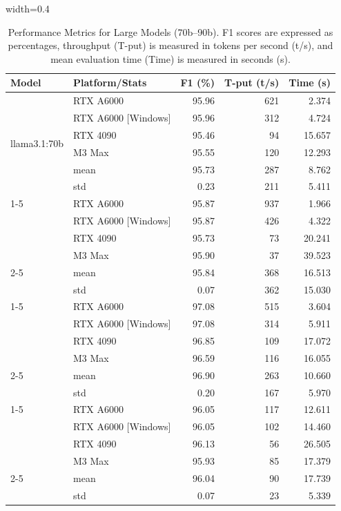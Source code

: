 \documentclass[conference]{IEEEtran}
\begin{document}
\begin{table}[htbp]
    \centering
    \begin{adjustbox}{width=0.4\textwidth}
    \begin{tabular}{llrrr}
\toprule
\textbf{Model} & \textbf{Platform/Stats} & \textbf{F1 (\%)} & \textbf{T-put (t/s)} & \textbf{Time (s)} \\
\midrule
\multirow[t]{6}{*}{llama3.1:70b} & RTX A6000 & 95.96 & 621 & 2.374 \\
 & RTX A6000 [Windows] & 95.96 & 312 & 4.724 \\
 & RTX 4090 & 95.46 & 94 & 15.657 \\
 & M3 Max & 95.55 & 120 & 12.293 \\
 \cmidrule(lr){2-5}
 & mean & 95.73 & 287 & 8.762 \\
 & std & 0.23 & 211 & 5.411 \\
\cline{1-5}
\multirow[t]{6}{*}{llama3.3:70b} & RTX A6000 & 95.87 & 937 & 1.966 \\
 & RTX A6000 [Windows] & 95.87 & 426 & 4.322 \\
 & RTX 4090 & 95.73 & 73 & 20.241 \\
 & M3 Max & 95.90 & 37 & 39.523 \\
 \cmidrule(lr){2-5}
 & mean & 95.84 & 368 & 16.513 \\
 & std & 0.07 & 362 & 15.030 \\
\cline{1-5}
\multirow[t]{6}{*}{qwen2.5:72b} & RTX A6000 & 97.08 & 515 & 3.604 \\
 & RTX A6000 [Windows] & 97.08 & 314 & 5.911 \\
 & RTX 4090 & 96.85 & 109 & 17.072 \\
 & M3 Max & 96.59 & 116 & 16.055 \\
 \cmidrule(lr){2-5}
 & mean & 96.90 & 263 & 10.660 \\
 & std & 0.20 & 167 & 5.970 \\
\cline{1-5}
\multirow[t]{6}{*}{llama3.2-vision:90b} & RTX A6000 & 96.05 & 117 & 12.611 \\
 & RTX A6000 [Windows] & 96.05 & 102 & 14.460 \\
 & RTX 4090 & 96.13 & 56 & 26.505 \\
 & M3 Max & 95.93 & 85 & 17.379 \\
 \cmidrule(lr){2-5}
 & mean & 96.04 & 90 & 17.739 \\
 & std & 0.07 & 23 & 5.339 \\
\bottomrule
\end{tabular}
    \end{adjustbox}
    \caption{Performance Metrics for Large Models (70b–90b). F1 scores are expressed as percentages, throughput (T-put) is measured in tokens per second (t/s), and mean evaluation time (Time) is measured in seconds (s).}
    \label{tab:large-models}
\end{table}
\end{document}
